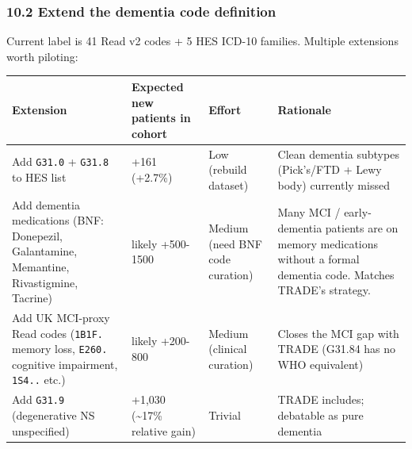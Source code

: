 \documentclass[
  11pt,
]{article}
\newcommand{\passthrough}[1]{#1}
\newcounter{none} %
\begin{document}
\subsubsection{10.2 Extend the dementia code
definition}\label{extend-the-dementia-code-definition}

Current label is 41 Read v2 codes + 5 HES ICD-10 families. Multiple
extensions worth piloting:

{\def\LTcaptype{none} %
\begin{longtable}[]{|>{\raggedright\arraybackslash}p{}|>{\raggedright\arraybackslash}p{}|>{\raggedright\arraybackslash}p{}|>{\raggedright\arraybackslash}p{}|}
\hline
\begin{minipage}[b]{\linewidth}\raggedright
Extension
\end{minipage} & \begin{minipage}[b]{\linewidth}\raggedright
Expected new patients in cohort
\end{minipage} & \begin{minipage}[b]{\linewidth}\raggedright
Effort
\end{minipage} & \begin{minipage}[b]{\linewidth}\raggedright
Rationale
\end{minipage} \\
\hline
\hline
\endhead
\hline
\endlastfoot
Add \passthrough{\lstinline!G31.0!} + \passthrough{\lstinline!G31.8!} to
HES list & +161 (+2.7\%) & Low (rebuild dataset) & Clean dementia
subtypes (Pick's/FTD + Lewy body) currently missed \\
\hline
Add dementia medications (BNF: Donepezil, Galantamine, Memantine,
Rivastigmine, Tacrine) & likely +500-1500 & Medium (need BNF code
curation) & Many MCI / early-dementia patients are on memory medications
without a formal dementia code. Matches TRADE's strategy. \\
\hline
Add UK MCI-proxy Read codes (\passthrough{\lstinline!1B1F.!} memory
loss, \passthrough{\lstinline!E260.!} cognitive impairment,
\passthrough{\lstinline!1S4..!} etc.) & likely +200-800 & Medium
(clinical curation) & Closes the MCI gap with TRADE (G31.84 has no WHO
equivalent) \\
\hline
Add \passthrough{\lstinline!G31.9!} (degenerative NS unspecified) &
+1,030 (\textasciitilde17\% relative gain) & Trivial & TRADE includes;
debatable as pure dementia \\
\hline
\end{longtable}
}
\end{document}
